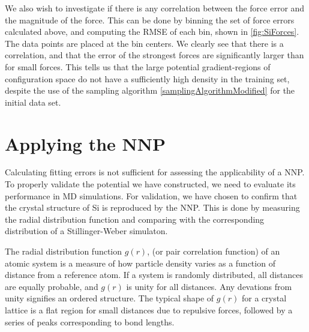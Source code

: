 \documentclass[twoside,english]{uiofysmaster}
\begin{document}
We also wish to investigate if there is any correlation between the force error and the magnitude of the force. 
This can be done by binning the set of force errors calculated above, and computing the RMSE of each bin, shown 
in \autoref{fig:SiForces}. The data points are placed at the bin centers. We clearly see that there 
is a correlation, and that the error of the strongest forces are significantly larger than for small forces. 
This tells us that the large potential gradient-regions of configuration space do not have a sufficiently
high density in the training set, despite the use of the sampling algorithm \eqref{samplingAlgorithmModified}
for the initial data set. 



\section{Applying the NNP}
Calculating fitting errors is not sufficient for assessing the applicability of a NNP. 
To properly validate the potential we have constructed, we need to evaluate its performance in MD simulations.
For validation, we have chosen to confirm that the crystal structure of Si is reproduced by the NNP. This is done by measuring 
the radial distribution function and comparing with the corresponding distribution of a Stillinger-Weber simulaton.

The radial distribution function $g(r)$, (or pair correlation function) of an atomic system is a measure of how 
particle density varies as a function of distance from a reference atom. If a system is randomly distributed, all distances
are equally probable, and $g(r)$ is unity for all distances. Any devations from unity signifies an ordered structure.
The typical shape of $g(r)$ for a crystal lattice is a flat region for small distances due to repulsive forces, 
followed by a series of peaks corresponding to bond lengths. 
 
\end{document}

